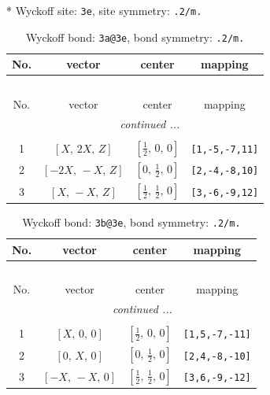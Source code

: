 \documentclass[fleqn,8pt]{jsarticle}
\begin{document}
* Wyckoff site: {\tt 3e}, site symmetry: {\tt .2/m.}
\renewcommand{\arraystretch}{1.2}
\begin{longtable}{cccc}
\caption{Wyckoff bond: {\tt 3a@3e}, bond symmetry: {\tt .2/m.}}
 \\
 \hline \hline
No. & vector & center & mapping \\ \hline \endfirsthead

\multicolumn{3}{l}{\tablename\ \thetable{}} \\
 \hline \hline
No. & vector & center & mapping \\ \hline \endhead

 \hline \hline
\multicolumn{3}{r}{\footnotesize\it continued ...} \\ \endfoot

 \hline \hline
\multicolumn{3}{r}{} \\ \endlastfoot

1 & $\left[ X,\, 2 X,\, Z \right]$ & $\left[ \frac{1}{2},\, 0,\, 0 \right]$ & {\tt [1,-5,-7,11]} \\ \hline
2 & $\left[ - 2 X,\, - X,\, Z \right]$ & $\left[ 0,\, \frac{1}{2},\, 0 \right]$ & {\tt [2,-4,-8,10]} \\ \hline
3 & $\left[ X,\, - X,\, Z \right]$ & $\left[ \frac{1}{2},\, \frac{1}{2},\, 0 \right]$ & {\tt [3,-6,-9,12]} \\
\end{longtable}
\renewcommand{\arraystretch}{1.2}
\begin{longtable}{cccc}
\caption{Wyckoff bond: {\tt 3b@3e}, bond symmetry: {\tt .2/m.}}
 \\
 \hline \hline
No. & vector & center & mapping \\ \hline \endfirsthead

\multicolumn{3}{l}{\tablename\ \thetable{}} \\
 \hline \hline
No. & vector & center & mapping \\ \hline \endhead

 \hline \hline
\multicolumn{3}{r}{\footnotesize\it continued ...} \\ \endfoot

 \hline \hline
\multicolumn{3}{r}{} \\ \endlastfoot

1 & $\left[ X,\, 0,\, 0 \right]$ & $\left[ \frac{1}{2},\, 0,\, 0 \right]$ & {\tt [1,5,-7,-11]} \\ \hline
2 & $\left[ 0,\, X,\, 0 \right]$ & $\left[ 0,\, \frac{1}{2},\, 0 \right]$ & {\tt [2,4,-8,-10]} \\ \hline
3 & $\left[ - X,\, - X,\, 0 \right]$ & $\left[ \frac{1}{2},\, \frac{1}{2},\, 0 \right]$ & {\tt [3,6,-9,-12]} \\
\end{longtable}
\end{document}
